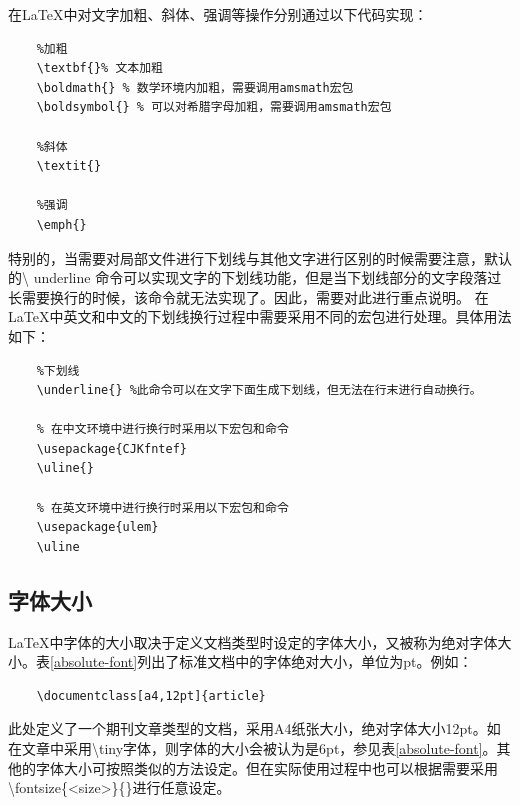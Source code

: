 \documentclass[12pt]{book}
\begin{document}
在\LaTeX{}中对文字加粗、斜体、强调等操作分别通过以下代码实现：

\begin{verbatim}
	%加粗
	\textbf{}% 文本加粗
	\boldmath{} % 数学环境内加粗，需要调用amsmath宏包
	\boldsymbol{} % 可以对希腊字母加粗，需要调用amsmath宏包
	
	%斜体
	\textit{}
	
	%强调
	\emph{}
\end{verbatim}

特别的，当需要对局部文件进行下划线与其他文字进行区别的时候需要注意，默认的\textbackslash
underline
命令可以实现文字的下划线功能，但是当下划线部分的文字段落过长需要换行的时候，该命令就无法实现了。因此，需要对此进行重点说明。
在\LaTeX{}中英文和中文的下划线换行过程中需要采用不同的宏包进行处理。具体用法如下：
\begin{verbatim}
	%下划线
	\underline{} %此命令可以在文字下面生成下划线，但无法在行末进行自动换行。
	
	% 在中文环境中进行换行时采用以下宏包和命令
	\usepackage{CJKfntef} 
	\uline{} 
	
	% 在英文环境中进行换行时采用以下宏包和命令
	\usepackage{ulem}
	\uline
\end{verbatim}


\subsection{字体大小}

\LaTeX{}中字体的大小取决于定义文档类型时设定的字体大小，又被称为绝对字体大小。表\ref{absolute-font}列出了标准文档中的字体绝对大小，单位为pt。例如：
\begin{verbatim}
	\documentclass[a4,12pt]{article} 
\end{verbatim}
此处定义了一个期刊文章类型的文档，采用A4纸张大小，绝对字体大小12pt。如在文章中采用\textbackslash tiny字体，则字体的大小会被认为是6pt，参见表\ref{absolute-font}。其他的字体大小可按照类似的方法设定。但在实际使用过程中也可以根据需要采用\textbackslash fontsize\{<size>\}\{<base line-skip>\}进行任意设定。
\end{document}

